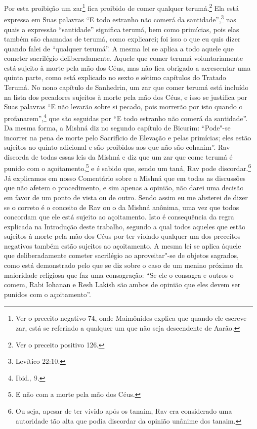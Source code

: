 \begin{multicols}{2}
Por esta proibição um zar\starr\footnote{Ver o preceito negativo 74, onde Maimônides explica que quando ele
  escreve zar\starr, está se referindo a qualquer um que não seja
  descendente de Aarão.} fica proibido de
comer qualquer terumá\starr.\footnote{Ver o preceito positivo 126.} Ela está expressa em
Suas palavras ``E todo estranho não comerá
da santidade'',\footnote{Levítico 22:10.} nas quais a expressão ``santidade''
significa terumá\starr, bem como primícias, pois elas também são chamadas
de terumá\starr, como explicarei; foi isso o que eu quis dizer quando
falei de ``qualquer terumá\starr''.
A mesma lei se aplica a todo aquele que cometer sacrilégio
deliberadamente.
Aquele que comer terumá\starr{} voluntariamente está sujeito à morte
pela mão dos Céus, mas não fica obrigado a acrescentar uma quinta parte,
como está explicado no sexto e sétimo capítulos do Tratado Terumá\starr. No
nono capítulo de Sanhedrin\starr, um zar\starr{} que comer terumá\starr{} está incluído na
lista dos
pecadores sujeitos à morte pela mão dos Céus, e isso se justifica por
Suas palavras ``E não levarão sobre si pecado, pois morrerão por isto
quando o profanarem'',\footnote{Ibid., 9.} que são seguidas por ``E todo estranho
não comerá da santidade''. Da mesma forma, a Mishná\starr{} diz no segundo
capítulo de Bicurim\starr: ``Pode"-se incorrer na pena de morte pelo Sacrifício de Elevação e pelas primícias; eles
estão sujeitos ao quinto adicional e são proibidos aos que não são
cohanim\starr''.
Rav discorda de todas essas leis da Mishná\starr{} e diz que um zar\starr{} que
come terumá\starr{} é punido com o açoitamento,\footnote{E não com a morte pela mão dos Céus.} e é
sabido que, sendo um taná\starr, Rav pode discordar.\footnote{Ou seja, apesar de ter vivido após os tanaim\starr, Rav era considerado uma autoridade tão
  alta que podia discordar da opinião unânime dos tanaim\starr.} Já
explicamos em nosso Comentário sobre a Mishná\starr{} que em todas as
discussões que não afetem o procedimento, e sim apenas a opinião, não darei uma decisão em favor de um ponto de vista ou de
outro. Sendo assim eu me absterei de dizer se o correto é o conceito de
Rav ou o da Mishná\starr{} anônima, uma vez que todos concordam que ele está
sujeito ao açoitamento. Isto é consequência da regra explicada na
Introdução deste trabalho, segundo a qual todos aqueles que estão
sujeitos à morte pela mão dos Céus por ter violado qualquer um dos
preceitos negativos também estão sujeitos ao açoitamento. A mesma lei se
aplica àquele que deliberadamente cometer sacrilégio ao aproveitar"-se
de objetos sagrados, como está demonstrado pelo que se diz sobre o caso
de um menino próximo da maioridade religiosa que faz uma consagração:
``Se ele o consagra e outros o comem, Rabi Iohanan\starr{} e Resh Lakish\starr{} são
ambos de opinião que eles devem ser punidos com o açoitamento''.


\end{multicols}
